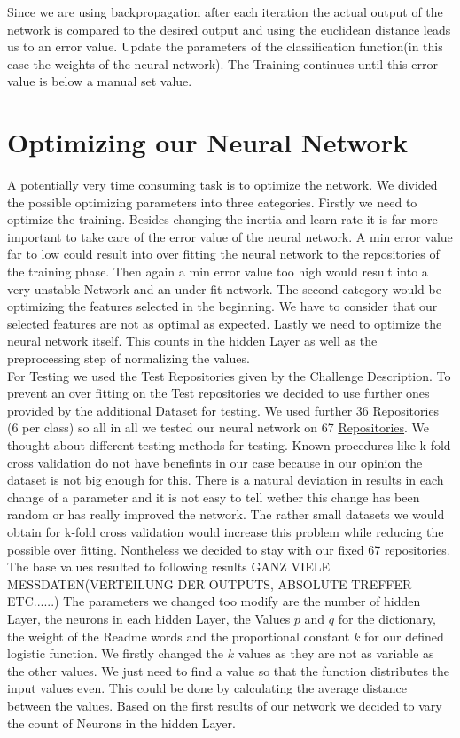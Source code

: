 \documentclass[paper=A4,pagesize=auto,11pt,headinclude=true,footinclude=true,BCOR=0mm,DIV=calc]{scrartcl}
\begin{document}
	Since we are using backpropagation after each iteration the actual output of the network is compared to the desired output and using the euclidean distance leads us to an error value. Update the parameters of the classification function(in this case the weights of the neural network). The Training continues until this error value is below a manual set value.
	
	
	
	\section{Optimizing our Neural Network }
	\label{src:optimizing}
	A potentially very time consuming task is to optimize the network. We divided the possible optimizing parameters into three categories. Firstly we need to optimize the training. Besides changing the inertia and learn rate it is far more important to take care of the error value of the neural network. A min error value far to low could result into over fitting the neural network to the repositories of the training phase. Then again a min error value too high would result into a very unstable Network and an under fit network. 
	The second category would be optimizing the features selected in the beginning. We have to consider that our selected features are not as optimal as expected.
	Lastly we need to optimize the neural network itself. This counts in the hidden Layer as well as the preprocessing step of normalizing the values.\\
	For Testing we used the Test Repositories given by the Challenge Description. To prevent an over fitting on the Test repositories we decided to use further ones provided by the additional Dataset for testing. We used further 36 Repositories (6 per class) so all in all we tested our neural network on 67 \hyperref[src:TestRepositories]{Repositories}.  We thought about different testing methods for testing. Known procedures like k-fold cross validation do not have benefints in our case because in our opinion the dataset is not big enough for this. There is a natural deviation in results in each change of a parameter and it is not easy to tell wether this change has been random or has really improved the network. The rather small datasets we would obtain for k-fold cross validation would increase this problem while reducing the possible over fitting. Nontheless we decided to stay with our fixed 67 repositories.
	The base values resulted to following results
	GANZ VIELE MESSDATEN(VERTEILUNG DER OUTPUTS, ABSOLUTE TREFFER ETC......)
	The parameters we changed too modify are the number of hidden Layer, the neurons in each hidden Layer, the Values $p$ and $q$ for the dictionary, the weight of the Readme words and the proportional constant $k$ for our defined logistic function.
	We firstly changed the $k$ values as they are not as variable as the other values. We just need to find a value so that the function distributes the input values even. This could be done by calculating the average distance between the values.
	Based on the first results of our network we decided to vary the count of Neurons in the hidden Layer.
	
\end{document}
